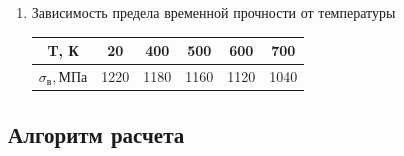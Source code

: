 \documentclass[a4paper,10pt]{article}
\begin{document}
\begin{enumerate}
\begin{enumerate}
	\item Зависимость предела временной прочности от температуры
	
	\begin{tabular}{|c|c|c|c|c|c|}
		\hline 
		T, К & 20 & 400 & 500 & 600 & 700 \\ 
		\hline 
		$\sigma_в, МПа$ & 1220 & 1180 & 1160 & 1120 & 1040 \\ 
		\hline 
		\end{tabular} 	
	
\end{enumerate}
\end{enumerate}

\subsection{Алгоритм расчета}
\end{document}
